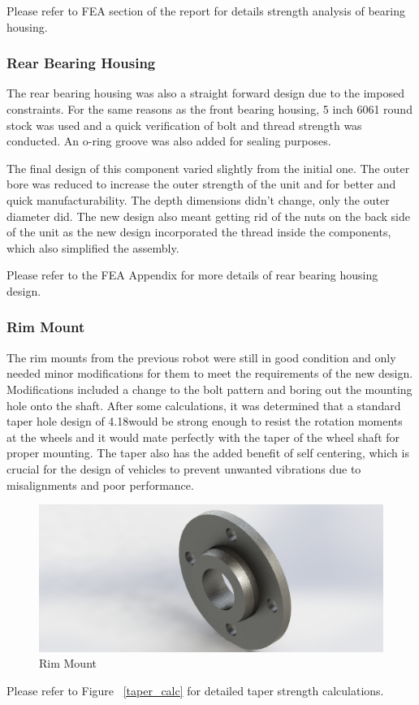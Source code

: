Please refer to FEA section of the report for details strength analysis of bearing housing.

\subsubsection{Rear Bearing Housing}
The rear bearing housing was also a straight forward design due to the imposed constraints. For the same reasons as the front bearing housing, 5 inch 6061 round stock was used and a quick verification of bolt and thread strength was conducted. An o-ring groove was also added for sealing purposes.

The final design of this component varied slightly from the initial one. The outer bore was reduced to increase the outer strength of the unit and for better and quick manufacturability. The depth dimensions didn't change, only the outer diameter did. The new design also meant getting rid of the nuts on the back side of the unit as the new design incorporated the thread inside the components, which also simplified the assembly.

Please refer to the FEA Appendix for more details of rear bearing housing design.

\subsubsection{Rim Mount}
The rim mounts from the previous robot were still in good condition and only needed minor modifications for them to meet the requirements of the new design. Modifications included a change to the bolt pattern and boring out the mounting hole onto the shaft. After some calculations, it was determined that a standard taper hole design of 4.18\degree would be strong enough to resist the rotation moments at the wheels and it would mate perfectly with the taper of the wheel shaft for proper mounting. The taper also has the added benefit of self centering, which is crucial for the design of vehicles to prevent unwanted vibrations due to misalignments and poor performance.

\begin{figure}[h]\centering
	\includegraphics[width=.7\linewidth]{dom/rim_mount_iso_rndr.jpg}
	\caption{Rim Mount}
	\label{fig:rid_mount}
\end{figure}
 

Please refer to Figure ~\ref{taper_calc} for detailed taper strength calculations.
